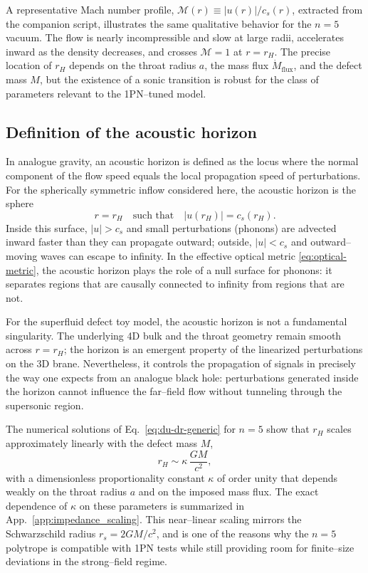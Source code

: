 \documentclass[11pt]{article}
\begin{document}
A representative Mach number profile,
\(\mathcal{M}(r) \equiv |u(r)|/c_s(r)\), extracted from the companion script,
illustrates the same qualitative behavior for the \(n=5\) vacuum.  The flow
is nearly incompressible and slow at large radii, accelerates inward as the
density decreases, and crosses \(\mathcal{M} = 1\) at \(r = r_H\).  The
precise location of \(r_H\) depends on the throat radius \(a\), the mass
flux \(\dot{M}_{\text{flux}}\), and the defect mass \(M\), but the existence
of a sonic transition is robust for the class of parameters relevant to the
1PN–tuned model.

\subsection{Definition of the acoustic horizon}
\label{subsec:acoustic-horizon-def}

In analogue gravity, an acoustic horizon is defined as the locus where the
normal component of the flow speed equals the local propagation speed of
perturbations.  For the spherically symmetric inflow considered here, the
acoustic horizon is the sphere
\begin{equation}
  r = r_H
  \quad \text{such that} \quad
  |u(r_H)| = c_s(r_H).
  \label{eq:acoustic-horizon}
\end{equation}
Inside this surface, \(|u| > c_s\) and small perturbations (phonons) are
advected inward faster than they can propagate outward; outside, \(|u| < c_s\)
and outward–moving waves can escape to infinity.  In the effective optical
metric \eqref{eq:optical-metric}, the acoustic horizon plays the role of a
null surface for phonons: it separates regions that are causally connected
to infinity from regions that are not.

For the superfluid defect toy model, the acoustic horizon is not a
fundamental singularity.  The underlying 4D bulk and the throat geometry
remain smooth across \(r = r_H\); the horizon is an emergent property of the
linearized perturbations on the 3D brane.  Nevertheless, it controls the
propagation of signals in precisely the way one expects from an analogue
black hole: perturbations generated inside the horizon cannot influence the
far–field flow without tunneling through the supersonic region.

The numerical solutions of Eq.~\eqref{eq:du-dr-generic} for \(n=5\) show
that \(r_H\) scales approximately linearly with the defect mass \(M\),
\begin{equation}
  r_H \sim \kappa\,\frac{G M}{c^2},
  \label{eq:rH-scaling}
\end{equation}
with a dimensionless proportionality constant \(\kappa\) of order unity that
depends weakly on the throat radius \(a\) and on the imposed mass flux.  The
exact dependence of \(\kappa\) on these parameters is summarized in
App.~\ref{app:impedance_scaling}.  This near–linear scaling mirrors the
Schwarzschild radius \(r_s = 2 G M / c^2\), and is one of the reasons why
the \(n=5\) polytrope is compatible with 1PN tests while still providing
room for finite–size deviations in the strong–field regime.
\end{document}
